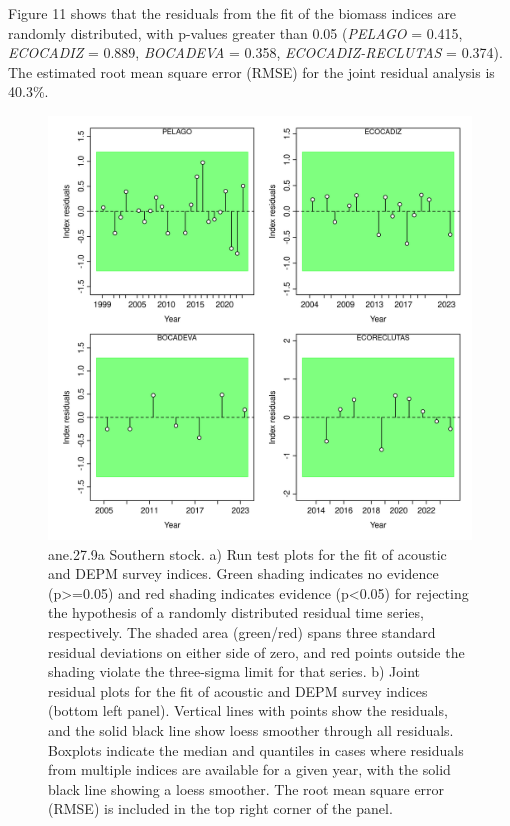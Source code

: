 \documentclass[
]{article}
\begin{document}
Figure 11 shows that the residuals from the fit of the biomass indices
are randomly distributed, with p-values greater than 0.05 (\emph{PELAGO}
= 0.415, \emph{ECOCADIZ} = 0.889, \emph{BOCADEVA} = 0.358,
\emph{ECOCADIZ-RECLUTAS} = 0.374). The estimated root mean square error
(RMSE) for the joint residual analysis is 40.3\%.

\begin{figure}[H]

{\centering \includegraphics[width=0.95\linewidth]{report/run/S1.0_4FLEETS_SelECO_RecIndex_Mnewfix/fig_runtest_residuals_indices} 

}

\caption{ane.27.9a Southern stock. a) Run test plots for the fit of acoustic and DEPM survey indices. Green shading indicates no evidence (p>=0.05) and red shading indicates evidence (p<0.05) for rejecting the hypothesis of a randomly distributed residual time series, respectively. The shaded area (green/red) spans three standard residual deviations on either side of zero, and red points outside the shading violate the three-sigma limit for that series. b) Joint residual plots for the fit of acoustic and DEPM survey indices (bottom left panel).  Vertical lines with points show the residuals, and the solid black line show loess smoother through all residuals. Boxplots indicate the median and quantiles in cases where residuals from multiple indices are available for a given year, with the solid black line showing a loess smoother. The root mean square error (RMSE) is included in the top right corner of the panel.}\label{fig:unnamed-chunk-41}
\end{figure}
\end{document}
